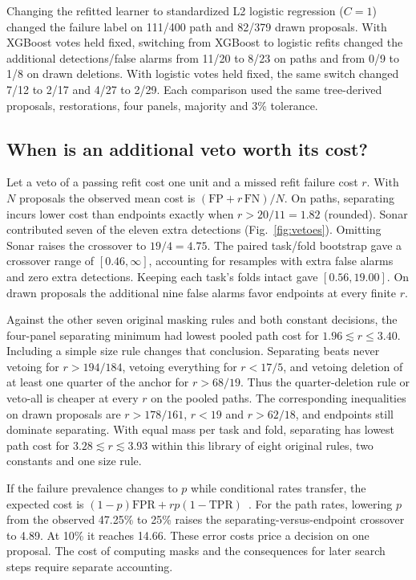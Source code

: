 Changing the refitted learner to standardized L2 logistic regression ($C=1$) changed the failure label on 111/400 path and 82/379 drawn proposals. With XGBoost votes held fixed, switching from XGBoost to logistic refits changed the additional detections/false alarms from 11/20 to 8/23 on paths and from 0/9 to 1/8 on drawn deletions. With logistic votes held fixed, the same switch changed 7/12 to 2/17 and 4/27 to 2/29. Each comparison used the same tree-derived proposals, restorations, four panels, majority and 3\% tolerance.

\subsection{When is an additional veto worth its cost?}
Let a veto of a passing refit cost one unit and a missed refit failure cost $r$. With $N$ proposals the observed mean cost is $(\mathrm{FP}+r\,\mathrm{FN})/N$. On paths, separating incurs lower cost than endpoints exactly when $r>20/11=1.82$ (rounded). Sonar contributed seven of the eleven extra detections (Fig.~\ref{fig:vetoes}). Omitting Sonar raises the crossover to $19/4=4.75$. The paired task/fold bootstrap gave a crossover range of $[0.46,\infty]$, accounting for resamples with extra false alarms and zero extra detections. Keeping each task's folds intact gave $[0.56,19.00]$. On drawn proposals the additional nine false alarms favor endpoints at every finite $r$.

Against the other seven original masking rules and both constant decisions, the four-panel separating minimum had lowest pooled path cost for $1.96\lesssim r\le3.40$. Including a simple size rule changes that conclusion. Separating beats never vetoing for $r>194/184$, vetoing everything for $r<17/5$, and vetoing deletion of at least one quarter of the anchor for $r>68/19$. Thus the quarter-deletion rule or veto-all is cheaper at every $r$ on the pooled paths. The corresponding inequalities on drawn proposals are $r>178/161$, $r<19$ and $r>62/18$, and endpoints still dominate separating. With equal mass per task and fold, separating has lowest path cost for $3.28\lesssim r\lesssim3.93$ within this library of eight original rules, two constants and one size rule.

If the failure prevalence changes to $p$ while conditional rates transfer, the expected cost is $(1-p)\mathrm{FPR}+r p(1-\mathrm{TPR})$~\cite{provost2001robust}. For the path rates, lowering $p$ from the observed 47.25\% to 25\% raises the separating-versus-endpoint crossover to 4.89. At 10\% it reaches 14.66. These error costs price a decision on one proposal. The cost of computing masks and the consequences for later search steps require separate accounting.

